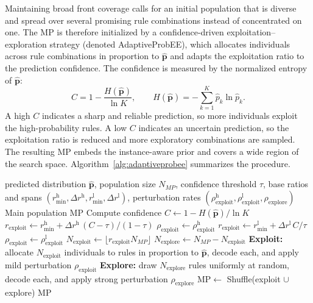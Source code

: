 \documentclass[pdflatex,iicol,Numbered,sn-basic]{sn-jnl}
\begin{document}
Maintaining broad front coverage calls for an initial population that is diverse and spread over several promising rule combinations instead of concentrated on one.
The MP is therefore initialized by a confidence-driven exploitation--exploration strategy (denoted AdaptiveProbEE), which allocates individuals across rule combinations in proportion to $\hat{\mathbf{p}}$ and adapts the exploitation ratio to the prediction confidence.
The confidence is measured by the normalized entropy of $\hat{\mathbf{p}}$:
\begin{equation}
  C = 1-\frac{H(\hat{\mathbf{p}})}{\ln K},\qquad
  H(\hat{\mathbf{p}})=-\sum_{k=1}^{K}\hat{p}_k\ln \hat{p}_k.
\end{equation}
A high $C$ indicates a sharp and reliable prediction, so more individuals exploit the high-probability rules. A low $C$ indicates an uncertain prediction, so the exploitation ratio is reduced and more exploratory combinations are sampled.
The resulting MP embeds the instance-aware prior and covers a wide region of the search space. Algorithm~\ref{alg:adaptiveprobee} summarizes the procedure.

\begin{algorithm}[t]
  \caption{AdaptiveProbEE: confidence-driven initialization of MP}
  \label{alg:adaptiveprobee}
  \begin{algorithmic}[1]
    \Require predicted distribution $\hat{\mathbf{p}}$, population size $N_{MP}$,
    confidence threshold $\tau$,
    base ratios and spans $(r^{\mathrm{h}}_{\min},\Delta r^{\mathrm{h}},r^{\mathrm{l}}_{\min},\Delta r^{\mathrm{l}})$,
    perturbation rates $(\rho^{\mathrm{h}}_{\mathrm{exploit}},\rho^{\mathrm{l}}_{\mathrm{exploit}},\rho_{\mathrm{explore}})$
    \Ensure Main population $\mathrm{MP}$
    \State Compute confidence $C \leftarrow 1-H(\hat{\mathbf{p}})/\ln K$
     
    \State $r_{\mathrm{exploit}}\leftarrow r^{\mathrm{h}}_{\min}+\Delta r^{\mathrm{h}}\,(C-\tau)/(1-\tau)$
    \State $\rho_{\mathrm{exploit}}\leftarrow \rho^{\mathrm{h}}_{\mathrm{exploit}}$
    \Else {}
    \State $r_{\mathrm{exploit}}\leftarrow r^{\mathrm{l}}_{\min}+\Delta r^{\mathrm{l}}\,C/\tau$
    \State $\rho_{\mathrm{exploit}}\leftarrow \rho^{\mathrm{l}}_{\mathrm{exploit}}$
    \EndIf
    \State $N_{\mathrm{exploit}}\leftarrow\lfloor r_{\mathrm{exploit}}N_{MP}\rfloor$
    \State $N_{\mathrm{explore}}\leftarrow N_{MP}-N_{\mathrm{exploit}}$    \State \textbf{Exploit:} allocate $N_{\mathrm{exploit}}$ individuals to rules in proportion to $\hat{\mathbf{p}}$,
    decode each, and apply mild perturbation $\rho_{\mathrm{exploit}}$
    \State \textbf{Explore:} draw $N_{\mathrm{explore}}$ rules uniformly at random,
    decode each, and apply strong perturbation $\rho_{\mathrm{explore}}$
    \State $\mathrm{MP}\leftarrow$ Shuffle(exploit $\cup$ explore)
    \State \Return $\mathrm{MP}$
  \end{algorithmic}
\end{algorithm}
\end{document}
